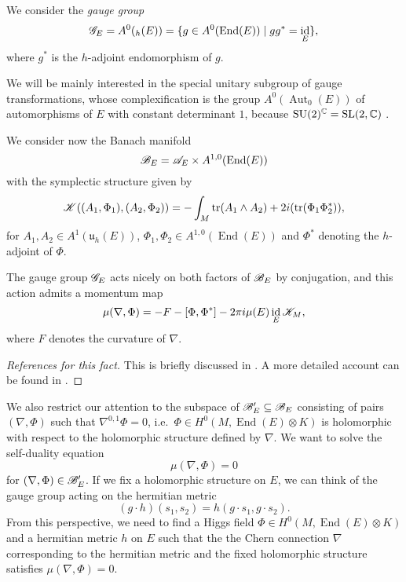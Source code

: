 \documentclass[A4paper, 12pt, british, reqno]{amsart}
\DeclareMathOperator{\End}{End}
\DeclareMathOperator{\Aut}{Aut}
\DeclareMathOperator{\id}{id}
\DeclareMathOperator{\tr}{tr}
\DeclareMathOperator{\SU}{SU}
\let\U\relax
\DeclareMathOperator{\U}{U}
\DeclareMathOperator{\SL}{SL}
\let\Im\relax
\DeclareMathOperator{\Im}{Im}
\newcommand{\ot}{\otimes}
\renewcommand{\u}{\mathfrak{u}}
\begin{document}
\begin{udefn}
    We consider the \textit{gauge group}
    \[ \G_{E}=A^{0}(\U_{h}(E))=\{ g\in A^{0}(\End(E)) \mid gg^{*}=\id_{E}\}, \]
    where $g^{*}$ is the $h$-adjoint endomorphism of $g$.
\end{udefn}

We will be mainly interested in the special unitary subgroup of gauge transformations, whose complexification is the group $A^{0}(\Aut_{0}(E))$ of automorphisms of $E$ with constant determinant $1$, because $\SU(2)^{\C}=\SL(2,\C)$ \cite[p.~376]{kna02}.

\begin{udefn}
    We consider now the Banach manifold
    \[ \sB_{E}=\sA_{E}\times A^{1,0}(\End(E)) \]
    with the symplectic structure given by
    \[ \sK((A_{1},\Phi_{1}),(A_{2},\Phi_{2}))=-\int_{M}\tr(A_{1}\wedge A_{2})+2i\Im(\tr(\Phi_{1}\Phi_{2}^{*})), \]
    for $A_{1},A_{2}\in A^{1}(\u_{h}(E))$, $\Phi_{1},\Phi_{2}\in A^{1,0}(\End(E))$ and $\Phi^{*}$ denoting the $h$-adjoint of $\Phi$.
\end{udefn}

\begin{fact}
    The gauge group $\mathscr{G}_{E}$ acts nicely on both factors of $\mathscr{B}_{E}$ by conjugation, and this action admits a momentum map
    \[ \mu(\nabla,\Phi)=-F-[\Phi,\Phi^{*}]-2\pi i \mu(E)\id_{E}\sK_{M}, \]
    where $F$ denotes the curvature of $\nabla$.
    \begin{proof}[References for this fact]
	This is briefly discussed in \cite[\S 4]{hit87a}.
	A more detailed account can be found in \cite[Proposition III.3.2]{gal19}.
    \end{proof}
\end{fact}


We also restrict our attention to the subspace of $\mathscr{B}_{E}'\subseteq \mathscr{B}_{E}$ consisting of pairs $(\nabla,\Phi)$ such that $\nabla^{0,1}\Phi=0$, i.e.~$\Phi\in H^{0}(M,\End(E)\ot K)$ is holomorphic with respect to the holomorphic structure defined by $\nabla$.
We want to solve the self-duality equation
\[ \mu(\nabla,\Phi)=0 \]
for $(\nabla,\Phi)\in \mathscr{B}_{E}'$.
If we fix a holomorphic structure on $E$, we can think of the gauge group acting on the hermitian metric
\[ (g\cdot h)(s_{1},s_{2})=h(g\cdot s_{1},g\cdot s_{2}). \]
From this perspective, we need to find a Higgs field $\Phi\in H^{0}(M,\End(E)\ot K)$ and a hermitian metric $h$ on $E$ such that the the Chern connection $\nabla$ corresponding to the hermitian metric and the fixed holomorphic structure satisfies $\mu(\nabla,\Phi)=0$.



\vfill
\end{document}
